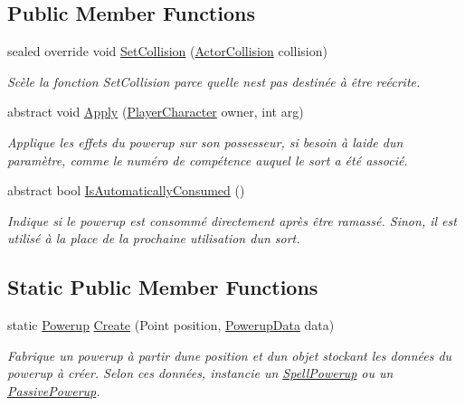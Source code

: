 \subsection*{Public Member Functions}
\begin{DoxyCompactItemize}
\item 
sealed override void \hyperlink{class_tentacle_slicers_1_1actors_1_1_powerup_aed821572dc4831af53c26150736986d5}{Set\+Collision} (\hyperlink{class_tentacle_slicers_1_1collisions_1_1_actor_collision}{Actor\+Collision} collision)
\begin{DoxyCompactList}\small\item\em Scèle la fonction Set\+Collision parce qu\textquotesingle{}elle n\textquotesingle{}est pas destinée à être reécrite. \end{DoxyCompactList}\item 
abstract void \hyperlink{class_tentacle_slicers_1_1actors_1_1_powerup_a65355e6ca82f35ca0d4ff111c03c8eee}{Apply} (\hyperlink{class_tentacle_slicers_1_1actors_1_1_player_character}{Player\+Character} owner, int arg)
\begin{DoxyCompactList}\small\item\em Applique les effets du powerup sur son possesseur, si besoin à l\textquotesingle{}aide d\textquotesingle{}un paramètre, comme le numéro de compétence auquel le sort a été associé. \end{DoxyCompactList}\item 
abstract bool \hyperlink{class_tentacle_slicers_1_1actors_1_1_powerup_a31b3367e7a72d80526d92486472d329d}{Is\+Automatically\+Consumed} ()
\begin{DoxyCompactList}\small\item\em Indique si le powerup est consommé directement après être ramassé. Sinon, il est utilisé à la place de la prochaine utilisation d\textquotesingle{}un sort. \end{DoxyCompactList}\end{DoxyCompactItemize}
\subsection*{Static Public Member Functions}
\begin{DoxyCompactItemize}
\item 
static \hyperlink{class_tentacle_slicers_1_1actors_1_1_powerup}{Powerup} \hyperlink{class_tentacle_slicers_1_1actors_1_1_powerup_a170bfc9101d384a73957470249458cfc}{Create} (Point position, \hyperlink{class_tentacle_slicers_1_1actors_1_1_powerup_data}{Powerup\+Data} data)
\begin{DoxyCompactList}\small\item\em Fabrique un powerup à partir d\textquotesingle{}une position et d\textquotesingle{}un objet stockant les données du powerup à créer. Selon ces données, instancie un \hyperlink{class_tentacle_slicers_1_1actors_1_1_spell_powerup}{Spell\+Powerup} ou un \hyperlink{class_tentacle_slicers_1_1actors_1_1_passive_powerup}{Passive\+Powerup}. \end{DoxyCompactList}\end{DoxyCompactItemize}
